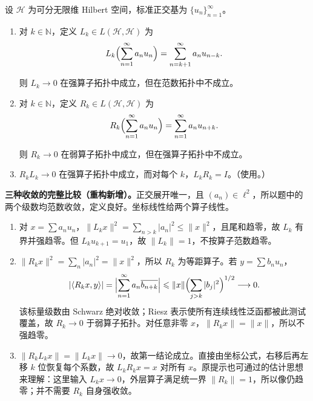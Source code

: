 \documentclass[../../main.tex]{subfiles}
\begin{document}
\begin{exercise}\label{exercise:ch05-shift-operators}
设 $\mathscr H$ 为可分无限维 Hilbert 空间，标准正交基为 $\{u_n\}_{n=1}^{\infty}$。
\begin{enumerate}
\item\label{item:ch05-left-shift-strong-zero}
\begin{definition*}[左移算子]\label{definition:ch05-left-shift}
对 $k\in\mathbb N$，定义 $L_k\in L(\mathscr H,\mathscr H)$ 为
\begin{align*}
L_k\Bigl(\sum_{n=1}^{\infty}a_nu_n\Bigr)=\sum_{n=k+1}^{\infty}a_nu_{n-k}.
\end{align*}
\end{definition*}
则 $L_k\to0$ 在强算子拓扑中成立，但在范数拓扑中不成立。
\item\label{item:ch05-right-shift-weak-zero}
\begin{definition*}[右移算子]\label{definition:ch05-right-shift}
对 $k\in\mathbb N$，定义 $R_k\in L(\mathscr H,\mathscr H)$ 为
\begin{align*}
R_k\Bigl(\sum_{n=1}^{\infty}a_nu_n\Bigr)=\sum_{n=1}^{\infty}a_nu_{n+k}.
\end{align*}
\end{definition*}
则 $R_k\to0$ 在弱算子拓扑中成立，但在强算子拓扑中不成立。
\item\label{item:ch05-shift-products} $R_kL_k\to0$ 在强算子拓扑中成立，而对每个 $k$，$L_kR_k=I$。（使用。）
\end{enumerate}
\end{exercise}
\begin{solution}
\textbf{三种收敛的完整比较（重构新增）。}正交展开唯一，且 $(a_n)\in\ell^2$，所以题中的两个级数均范数收敛，定义良好。坐标线性给两个算子线性。
\begin{enumerate}
\item 对 $x=\sum a_nu_n$，$\|L_kx\|^2=\sum_{n>k}|a_n|^2\leqslant\|x\|^2$，且尾和趋零，故 $L_k$ 有界并强趋零。但 $L_ku_{k+1}=u_1$，故 $\|L_k\|=1$，不按算子范数趋零。
\item $\|R_kx\|^2=\sum_n|a_n|^2=\|x\|^2$，所以 $R_k$ 为等距算子。若 $y=\sum b_nu_n$，
\begin{align*}
|\langle R_kx,y\rangle|
=\Bigl|\sum_{n=1}^{\infty}a_n\overline{b_{n+k}}\Bigr|
\leqslant\|x\|\Bigl(\sum_{j>k}|b_j|^2\Bigr)^{1/2}\longrightarrow0.
\end{align*}
该标量级数由 Schwarz 绝对收敛；Riesz 表示使所有连续线性泛函都被此测试覆盖，故 $R_k\to0$ 于弱算子拓扑。对任意非零 $x$，$\|R_kx\|=\|x\|$，所以不强趋零。
\item $\|R_kL_kx\|=\|L_kx\|\to0$，故第一结论成立。直接由坐标公式，右移后再左移 $k$ 位恢复每个系数，故 $L_kR_kx=x$ 对所有 $x$。原提示也可通过的估计思想来理解：这里输入 $L_kx\to0$，外层算子满足统一界 $\|R_k\|=1$，所以像仍趋零；并不需要 $R_k$ 自身强收敛。
\end{enumerate}
\end{solution}
\end{document}
